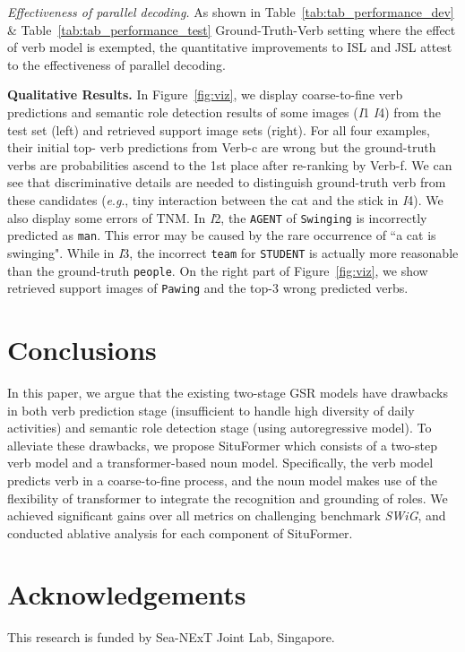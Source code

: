\documentclass[letterpaper]{article} \usepackage{aaai22}  \usepackage{times}  \usepackage{helvet}  \usepackage{courier}  \usepackage[hyphens]{url}  \usepackage{graphicx} \urlstyle{rm} \def\UrlFont{\rm}  \usepackage{natbib}  \usepackage{caption} \DeclareCaptionStyle{ruled}{labelfont=normalfont,labelsep=colon,strut=off} \frenchspacing  \setlength{\pdfpagewidth}{8.5in}  \setlength{\pdfpageheight}{11in}
\newcommand{\eg}{\textit{e}.\textit{g}.}
\begin{document}
\noindent\emph{Effectiveness of parallel decoding.} As shown in Table~\ref{tab:tab_performance_dev} \& Table~\ref{tab:tab_performance_test} Ground-Truth-Verb setting where the effect of verb model is exempted, the quantitative improvements to ISL and JSL attest to the effectiveness of parallel decoding.

\noindent\textbf{Qualitative Results.}
In Figure~\ref{fig:viz}, we display coarse-to-fine verb predictions and semantic role detection results of some images (\textit{I}1 
 \textit{I}4) from the test set (left) and retrieved support image sets (right). For all four examples, their initial top- verb predictions from Verb-c are wrong but the ground-truth verbs are probabilities ascend to the 1st place after re-ranking by Verb-f. 
We can see that discriminative details are needed to distinguish ground-truth verb from these candidates (\eg, tiny interaction between the cat and the stick in \textit{I}4).
We also display some errors of TNM.
In \textit{I}2, the \texttt{AGENT} of \texttt{Swinging} is incorrectly predicted as \texttt{man}. This error may be caused by the rare occurrence of ``a cat is swinging".
While in \textit{I}3, the incorrect \texttt{team} for \texttt{STUDENT} is actually more reasonable than the ground-truth \texttt{people}. On the right part of Figure~\ref{fig:viz}, we show retrieved support images of \texttt{Pawing} and the top-3 wrong predicted verbs.









\section{Conclusions}
In this paper, we argue that the existing two-stage GSR models have drawbacks in both verb prediction stage (insufficient to handle high diversity of daily activities) and semantic role detection stage (using autoregressive model). To alleviate these drawbacks, we propose 
SituFormer which consists of a two-step verb model and a transformer-based noun model. Specifically, the verb model predicts verb in a coarse-to-fine process, and the noun model makes use of the flexibility of transformer to integrate the recognition and grounding of roles. We achieved significant gains over all metrics on challenging benchmark \textit{SWiG}, and conducted ablative analysis for each component of SituFormer.


\section{Acknowledgements}
This research is funded by Sea-NExT Joint Lab, Singapore.



\end{document}
